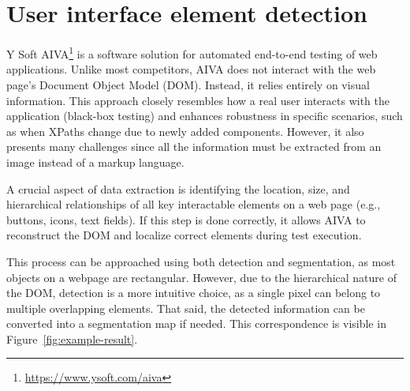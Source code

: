 \documentclass[
  digital,     %
  oneside,     %
  nosansbold,  %
  nocolorbold, %
  lof,         %
  lot,         %
]{fithesis4}
\begin{document}
\chapter{User interface element detection}

Y Soft AIVA\footnote{\url{https://www.ysoft.com/aiva}} is a software solution for automated end-to-end testing of web applications. Unlike most competitors, AIVA does not interact with the web page's Document Object Model (DOM). Instead, it relies entirely on visual information. This approach closely resembles how a real user interacts with the application (black-box testing) and enhances robustness in specific scenarios, such as when XPaths change due to newly added components. However, it also presents many challenges since all the information must be extracted from an image instead of a markup language.

A crucial aspect of data extraction is identifying the location, size, and hierarchical relationships of all key interactable elements on a web page (e.g., buttons, icons, text fields). If this step is done correctly, it allows AIVA to reconstruct the DOM and localize correct elements during test execution.

This process can be approached using both detection and segmentation, as most objects on a webpage are rectangular. However, due to the hierarchical nature of the DOM, detection is a more intuitive choice, as a single pixel can belong to multiple overlapping elements. That said, the detected information can be converted into a segmentation map if needed. This correspondence is visible in Figure~\ref{fig:example-result}.
\end{document}
